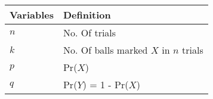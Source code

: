 	\begin{table}[]
		\begin{tabular}{|l|l|}\hline
			Variables	&Definition\\ \hline
			$n$	&No. Of trials\\ \hline
			$k$	&No. Of balls marked $X$ in $n$ trials\\ \hline
			$p$	&Pr($X$)\\ \hline
			$q$	&Pr($Y$) = 1 - Pr($X$)\\	\hline		
		\end{tabular}
	\end{table}

